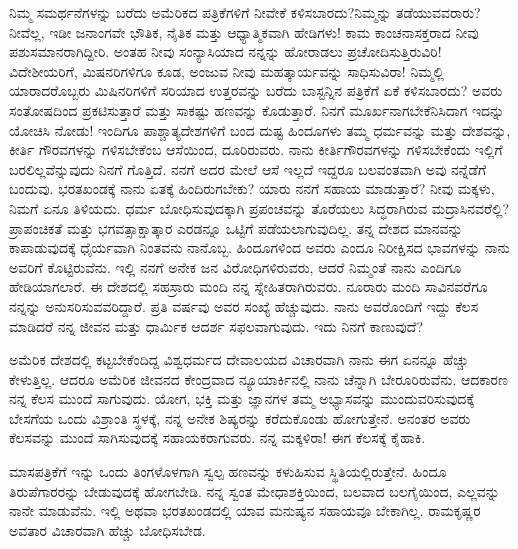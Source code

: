 ನಿಮ್ಮ ಸಮರ್ಥನೆಗಳನ್ನು ಬರೆದು ಅಮೆರಿಕದ ಪತ್ರಿಕೆಗಳಿಗೆ ನೀವೇಕೆ ಕಳಿಸಬಾರದು?\break ನಿಮ್ಮನ್ನು ತಡೆಯುವವರಾರು? ನೀವೆಲ್ಲ, ಇಡೀ ಜನಾಂಗವೇ ಭೌತಿಕ, ನೈತಿಕ ಮತ್ತು ಆಧ್ಯಾತ್ಮಿಕವಾಗಿ ಹೇಡಿಗಳು! ಕಾಮ ಕಾಂಚನಾಸಕ್ತರಾದ ನೀವು ಪಶುಸಮಾನರಾಗಿದ್ದೀರಿ. ಅಂತಹ ನೀವು ಸಂನ್ಯಾಸಿಯಾದ ನನ್ನನ್ನು ಹೋರಾಡಲು ಪ್ರಚೋದಿಸುತ್ತಿರುವಿರಿ! ವಿದೇಶೀಯರಿಗೆ, ಮಿಷನರಿಗಳಿಗೂ ಕೂಡ, ಅಂಜುವ ನೀವು ಮಹತ್ಕಾರ್ಯವನ್ನು ಸಾಧಿಸುವಿರಾ! ನಿಮ್ಮಲ್ಲಿ ಯಾರಾದರೊಬ್ಬರು ಮಿಷಿನರಿಗಳಿಗೆ ಸರಿಯಾದ ಉತ್ತರವನ್ನು ಬರೆದು ಬಾಸ್ಟನ್ನಿನ  ಪತ್ರಿಕೆಗೆ ಏಕೆ ಕಳಿಸಬಾರದು? ಅವರು ಸಂತೋಷದಿಂದ ಪ್ರಕಟಿಸುತ್ತಾರೆ ಮತ್ತು ಸಾಕಷ್ಟು ಹಣವನ್ನು ಕೊಡುತ್ತಾರೆ. ನಿನಗೆ ಮೂರ್ಖನಾಗಬೇಕೆನಿಸಿದಾಗ ಇದನ್ನು ಯೋಚಿಸಿ ನೋಡು! ಇಂದಿಗೂ ಪಾಶ್ಚಾತ್ಯದೇಶಗಳಿಗೆ ಬಂದ ದುಷ್ಟ ಹಿಂದೂಗಳು ತಮ್ಮ ಧರ್ಮವನ್ನು ಮತ್ತು ದೇಶವನ್ನು, ಕೀರ್ತಿ ಗೌರವಗಳನ್ನು ಗಳಿಸಬೇಕೆಂಬ ಆಸೆಯಿಂದ, ದೂರಿರುವರು. ನಾನು ಕೀರ್ತಿಗೌರವಗಳನ್ನು ಗಳಿಸಬೇಕೆಂದು ಇಲ್ಲಿಗೆ ಬರಲಿಲ್ಲವೆನ್ನುವುದು ನಿನಗೆ ಗೊತ್ತಿದೆ. ನನಗೆ ಅದರ ಮೇಲೆ ಆಸೆ ಇಲ್ಲದೆ ಇದ್ದರೂ ಬಲವಂತವಾಗಿ ಅವು ನನ್ನೆಡೆಗೆ ಬಂದುವು. ಭರತಖಂಡಕ್ಕೆ ನಾನು ಏತಕ್ಕೆ ಹಿಂದಿರುಗಬೇಕು? ಯಾರು ನನಗೆ ಸಹಾಯ ಮಾಡುತ್ತಾರೆ? ನೀವು ಮಕ್ಕಳು, ನಿಮಗೆ ಏನೂ ತಿಳಿಯದು. ಧರ್ಮ ಬೋಧಿಸುವುದಕ್ಕಾಗಿ ಪ್ರಪಂಚವನ್ನು ತೊರೆಯಲು ಸಿದ್ಧರಾಗಿರುವ ಮದ್ರಾಸಿನವರೆಲ್ಲಿ? ಪ್ರಾಪಂಚಿಕತೆ ಮತ್ತು ಭಗವತ್ಸಾಕ್ಷಾತ್ಕಾರ ಎರಡನ್ನೂ ಒಟ್ಟಿಗೆ ಪಡೆಯಲಾಗುವುದಿಲ್ಲ. ತನ್ನ ದೇಶದ ಮಾನವನ್ನು ಕಾಪಾಡುವುದಕ್ಕೆ ಧೈರ್ಯವಾಗಿ ನಿಂತವನು ನಾನೊಬ್ಬ. ಹಿಂದೂಗಳಿಂದ ಅವರು ಎಂದೂ ನಿರೀಕ್ಷಿಸದ ಭಾವಗಳನ್ನು ನಾನು ಅವರಿಗೆ ಕೊಟ್ಟಿರುವೆನು. ಇಲ್ಲಿ ನನಗೆ ಅನೇಕ ಜನ ವಿರೋಧಿಗಳಿರುವರು, ಆದರೆ ನಿಮ್ಮಂತೆ ನಾನು ಎಂದಿಗೂ ಹೇಡಿಯಾಗಲಾರೆ. ಈ ದೇಶದಲ್ಲಿ ಸಹಸ್ರಾರು ಮಂದಿ ನನ್ನ ಸ್ನೇಹಿತರಾಗಿರುವರು. ನೂರಾರು ಮಂದಿ ಸಾವಿನವರೆಗೂ ನನ್ನನ್ನು ಅನುಸರಿಸುವವರಿದ್ದಾರೆ. ಪ್ರತಿ ವರ್ಷವು ಅವರ ಸಂಖ್ಯೆ ಹೆಚ್ಚುವುದು. ನಾನು ಅವರೊಂದಿಗೆ ಇದ್ದು ಕೆಲಸ ಮಾಡಿದರೆ ನನ್ನ ಜೀವನ ಮತ್ತು ಧಾರ್ಮಿಕ ಆದರ್ಶ ಸಫಲವಾಗುವುದು. ಇದು ನಿನಗೆ ಕಾಣುವುದೆ?

ಅಮೆರಿಕ ದೇಶದಲ್ಲಿ ಕಟ್ಟಬೇಕೆಂದಿದ್ದ ವಿಶ್ವಧರ್ಮದ ದೇವಾಲಯದ ವಿಚಾರವಾಗಿ ನಾನು ಈಗ ಏನನ್ನೂ ಹೆಚ್ಚು ಕೇಳುತ್ತಿಲ್ಲ. ಆದರೂ ಅಮೆರಿಕ ಜೀವನದ ಕೇಂದ್ರವಾದ ನ್ಯೂಯಾರ್ಕಿನಲ್ಲಿ ನಾನು ಚೆನ್ನಾಗಿ ಬೇರೂರಿರುವೆನು. ಆದಕಾರಣ ನನ್ನ ಕೆಲಸ ಮುಂದೆ ಸಾಗುವುದು. ಯೋಗ, ಭಕ್ತಿ ಮತ್ತು ಜ್ಞಾನಗಳ ತಮ್ಮ ಅಭ್ಯಾಸವನ್ನು ಮುಂದುವರಿಸುವುದಕ್ಕೆ ಬೇಸಗೆಯ ಒಂದು ವಿಶ್ರಾಂತಿ ಸ್ಥಳಕ್ಕೆ, ನನ್ನ ಅನೇಕ ಶಿಷ್ಯರನ್ನು ಕರೆದುಕೊಂಡು ಹೋಗುತ್ತೇನೆ. ಅನಂತರ ಅವರು ಕೆಲಸವನ್ನು ಮುಂದೆ ಸಾಗಿಸುವುದಕ್ಕೆ ಸಹಾಯಕರಾಗುವರು. ನನ್ನ ಮಕ್ಕಳಿರಾ! ಈಗ ಕೆಲಸಕ್ಕೆ ಕೈಹಾಕಿ.

ಮಾಸಪತ್ರಿಕೆಗೆ ಇನ್ನು ಒಂದು ತಿಂಗಳೊಳಗಾಗಿ ಸ್ವಲ್ಪ ಹಣವನ್ನು ಕಳುಹಿಸುವ ಸ್ಥಿತಿಯಲ್ಲಿರುತ್ತೇನೆ. ಹಿಂದೂ ತಿರುಪೆಗಾರರನ್ನು ಬೇಡುವುದಕ್ಕೆ ಹೋಗಬೇಡಿ. ನನ್ನ ಸ್ವಂತ ಮೇಧಾಶಕ್ತಿಯಿಂದ, ಬಲವಾದ ಬಲಗೈಯಿಂದ, ಎಲ್ಲವನ್ನು ನಾನೇ ಮಾಡುವೆನು. ಇಲ್ಲಿ ಅಥವಾ ಭರತಖಂಡದಲ್ಲಿ ಯಾವ ಮನುಷ್ಯನ ಸಹಾಯವೂ ಬೇಕಾಗಿಲ್ಲ. ರಾಮಕೃಷ್ಣರ ಅವತಾರ ವಿಚಾರವಾಗಿ ಹೆಚ್ಚು ಬೋಧಿಸಬೇಡ.

